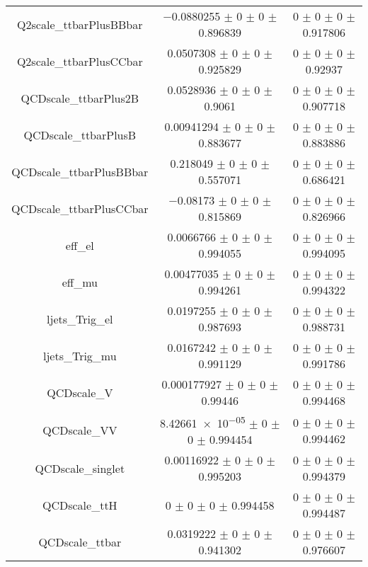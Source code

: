 \begin{table}
\begin{tabular}{ccc}
Q2scale\_ttbarPlusBBbar & \num{-0.0880255} $\pm$ \num{0} $\pm$ \num{0} $\pm$ \num{0.896839} & \num{0} $\pm$ \num{0} $\pm$ \num{0} $\pm$ \num{0.917806}\\
Q2scale\_ttbarPlusCCbar & \num{0.0507308} $\pm$ \num{0} $\pm$ \num{0} $\pm$ \num{0.925829} & \num{0} $\pm$ \num{0} $\pm$ \num{0} $\pm$ \num{0.92937}\\
QCDscale\_ttbarPlus2B & \num{0.0528936} $\pm$ \num{0} $\pm$ \num{0} $\pm$ \num{0.9061} & \num{0} $\pm$ \num{0} $\pm$ \num{0} $\pm$ \num{0.907718}\\
QCDscale\_ttbarPlusB & \num{0.00941294} $\pm$ \num{0} $\pm$ \num{0} $\pm$ \num{0.883677} & \num{0} $\pm$ \num{0} $\pm$ \num{0} $\pm$ \num{0.883886}\\
QCDscale\_ttbarPlusBBbar & \num{0.218049} $\pm$ \num{0} $\pm$ \num{0} $\pm$ \num{0.557071} & \num{0} $\pm$ \num{0} $\pm$ \num{0} $\pm$ \num{0.686421}\\
QCDscale\_ttbarPlusCCbar & \num{-0.08173} $\pm$ \num{0} $\pm$ \num{0} $\pm$ \num{0.815869} & \num{0} $\pm$ \num{0} $\pm$ \num{0} $\pm$ \num{0.826966}\\
eff\_el & \num{0.0066766} $\pm$ \num{0} $\pm$ \num{0} $\pm$ \num{0.994055} & \num{0} $\pm$ \num{0} $\pm$ \num{0} $\pm$ \num{0.994095}\\
eff\_mu & \num{0.00477035} $\pm$ \num{0} $\pm$ \num{0} $\pm$ \num{0.994261} & \num{0} $\pm$ \num{0} $\pm$ \num{0} $\pm$ \num{0.994322}\\
ljets\_Trig\_el & \num{0.0197255} $\pm$ \num{0} $\pm$ \num{0} $\pm$ \num{0.987693} & \num{0} $\pm$ \num{0} $\pm$ \num{0} $\pm$ \num{0.988731}\\
ljets\_Trig\_mu & \num{0.0167242} $\pm$ \num{0} $\pm$ \num{0} $\pm$ \num{0.991129} & \num{0} $\pm$ \num{0} $\pm$ \num{0} $\pm$ \num{0.991786}\\
QCDscale\_V & \num{0.000177927} $\pm$ \num{0} $\pm$ \num{0} $\pm$ \num{0.99446} & \num{0} $\pm$ \num{0} $\pm$ \num{0} $\pm$ \num{0.994468}\\
QCDscale\_VV & \num{8.42661e-05} $\pm$ \num{0} $\pm$ \num{0} $\pm$ \num{0.994454} & \num{0} $\pm$ \num{0} $\pm$ \num{0} $\pm$ \num{0.994462}\\
QCDscale\_singlet & \num{0.00116922} $\pm$ \num{0} $\pm$ \num{0} $\pm$ \num{0.995203} & \num{0} $\pm$ \num{0} $\pm$ \num{0} $\pm$ \num{0.994379}\\
QCDscale\_ttH & \num{0} $\pm$ \num{0} $\pm$ \num{0} $\pm$ \num{0.994458} & \num{0} $\pm$ \num{0} $\pm$ \num{0} $\pm$ \num{0.994487}\\
QCDscale\_ttbar & \num{0.0319222} $\pm$ \num{0} $\pm$ \num{0} $\pm$ \num{0.941302} & \num{0} $\pm$ \num{0} $\pm$ \num{0} $\pm$ \num{0.976607}\\

\end{tabular}
\end{table}
